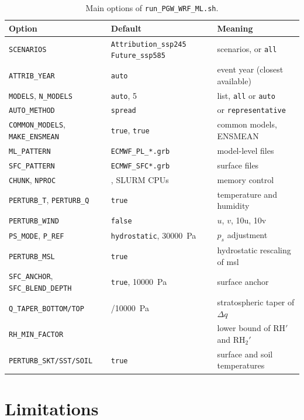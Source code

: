 \documentclass[11pt,a4paper]{article}
\newcommand{\code}[1]{\texttt{#1}}
\begin{document}
\begin{table}[htbp]
\centering
\caption{Main options of \code{run\_PGW\_WRF\_ML.sh}.}
\label{tab:opts}
\small
\begin{tabularx}{\linewidth}{>{\raggedright\arraybackslash}p{4.6cm}>{\raggedright\arraybackslash}p{3.6cm}X}
\toprule
Option & Default & Meaning \\
\midrule
\code{SCENARIOS} & \code{Attribution\_ssp245} \code{Future\_ssp585} & scenarios, or \code{all} \\
\code{ATTRIB\_YEAR} & \code{auto} & event year (closest available) \\
\code{MODELS}, \code{N\_MODELS} & \code{auto}, 5 & list, \code{all} or \code{auto} \\
\code{AUTO\_METHOD} & \code{spread} & or \code{representative} \\
\code{COMMON\_MODELS}, \code{MAKE\_ENSMEAN} & \code{true}, \code{true} & common models, ENSMEAN \\
\code{ML\_PATTERN} & \code{ECMWF\_PL\_*.grb} & model-level files \\
\code{SFC\_PATTERN} & \code{ECMWF\_SFC*.grb} & surface files \\
\code{CHUNK}, \code{NPROC} & 20000, SLURM CPUs & memory control \\
\midrule
\code{PERTURB\_T}, \code{PERTURB\_Q} & \code{true} & temperature and humidity \\
\code{PERTURB\_WIND} & \code{false} & $u$, $v$, 10u, 10v \\
\code{PS\_MODE}, \code{P\_REF} & \code{hydrostatic}, \SI{30000}{Pa} & $p_s$ adjustment \\
\code{PERTURB\_MSL} & \code{true} & hydrostatic rescaling of msl \\
\code{SFC\_ANCHOR}, \code{SFC\_BLEND\_DEPTH} & \code{true}, \SI{10000}{Pa} & surface anchor \\
\code{Q\_TAPER\_BOTTOM/TOP} & 15000/\SI{10000}{Pa} & stratospheric taper of $\Delta q$ \\
\code{RH\_MIN\_FACTOR} & 0.5 & lower bound of $\mathrm{RH}'$ and $\mathrm{RH}_2'$ \\
\code{PERTURB\_SKT/SST/SOIL} & \code{true} & surface and soil temperatures \\
\bottomrule
\end{tabularx}
\end{table}

\section{Limitations}
\label{sec:limits}
\end{document}
